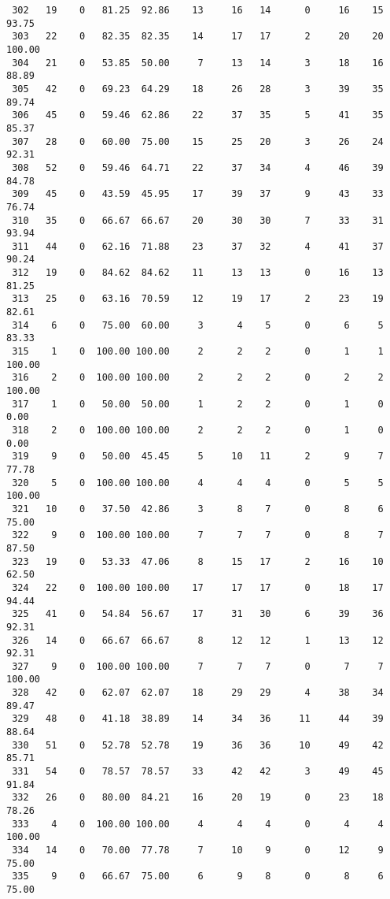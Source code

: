 \begin{verbatim}
 302   19    0   81.25  92.86    13     16   14      0     16    15    93.75
 303   22    0   82.35  82.35    14     17   17      2     20    20   100.00
 304   21    0   53.85  50.00     7     13   14      3     18    16    88.89
 305   42    0   69.23  64.29    18     26   28      3     39    35    89.74
 306   45    0   59.46  62.86    22     37   35      5     41    35    85.37
 307   28    0   60.00  75.00    15     25   20      3     26    24    92.31
 308   52    0   59.46  64.71    22     37   34      4     46    39    84.78
 309   45    0   43.59  45.95    17     39   37      9     43    33    76.74
 310   35    0   66.67  66.67    20     30   30      7     33    31    93.94
 311   44    0   62.16  71.88    23     37   32      4     41    37    90.24
 312   19    0   84.62  84.62    11     13   13      0     16    13    81.25
 313   25    0   63.16  70.59    12     19   17      2     23    19    82.61
 314    6    0   75.00  60.00     3      4    5      0      6     5    83.33
 315    1    0  100.00 100.00     2      2    2      0      1     1   100.00
 316    2    0  100.00 100.00     2      2    2      0      2     2   100.00
 317    1    0   50.00  50.00     1      2    2      0      1     0     0.00
 318    2    0  100.00 100.00     2      2    2      0      1     0     0.00
 319    9    0   50.00  45.45     5     10   11      2      9     7    77.78
 320    5    0  100.00 100.00     4      4    4      0      5     5   100.00
 321   10    0   37.50  42.86     3      8    7      0      8     6    75.00
 322    9    0  100.00 100.00     7      7    7      0      8     7    87.50
 323   19    0   53.33  47.06     8     15   17      2     16    10    62.50
 324   22    0  100.00 100.00    17     17   17      0     18    17    94.44
 325   41    0   54.84  56.67    17     31   30      6     39    36    92.31
 326   14    0   66.67  66.67     8     12   12      1     13    12    92.31
 327    9    0  100.00 100.00     7      7    7      0      7     7   100.00
 328   42    0   62.07  62.07    18     29   29      4     38    34    89.47
 329   48    0   41.18  38.89    14     34   36     11     44    39    88.64
 330   51    0   52.78  52.78    19     36   36     10     49    42    85.71
 331   54    0   78.57  78.57    33     42   42      3     49    45    91.84
 332   26    0   80.00  84.21    16     20   19      0     23    18    78.26
 333    4    0  100.00 100.00     4      4    4      0      4     4   100.00
 334   14    0   70.00  77.78     7     10    9      0     12     9    75.00
 335    9    0   66.67  75.00     6      9    8      0      8     6    75.00

\end{verbatim}
